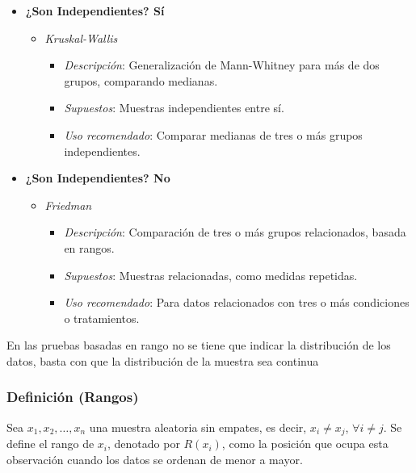 \documentclass{article}
\begin{document}
\begin{itemize}
    \item \textbf{¿Son Independientes? Sí}
          \begin{itemize}
              \item \textit{Kruskal-Wallis}
                    \begin{itemize}
                        \item \textit{Descripción}: Generalización de Mann-Whitney para más de dos grupos, comparando medianas.
                        \item \textit{Supuestos}: Muestras independientes entre sí.
                        \item \textit{Uso recomendado}: Comparar medianas de tres o más grupos independientes.
                    \end{itemize}
          \end{itemize}

    \item \textbf{¿Son Independientes? No}
          \begin{itemize}
              \item \textit{Friedman}
                    \begin{itemize}
                        \item \textit{Descripción}: Comparación de tres o más grupos relacionados, basada en rangos.
                        \item \textit{Supuestos}: Muestras relacionadas, como medidas repetidas.
                        \item \textit{Uso recomendado}: Para datos relacionados con tres o más condiciones o tratamientos.
                    \end{itemize}
          \end{itemize}
\end{itemize}

En las pruebas basadas en rango no se tiene que indicar la distribución de los datos, basta con que la distribución de la muestra sea continua

\subsubsection*{Definición (Rangos)}

Sea $x_1, x_2, \ldots, x_n$ una muestra aleatoria sin empates, es decir, $x_i \neq x_j$, $\forall i \neq j$. Se define el rango de $x_i$, denotado por $R(x_i)$, como la posición que ocupa esta observación cuando los datos se ordenan de menor a mayor.
\end{document}
